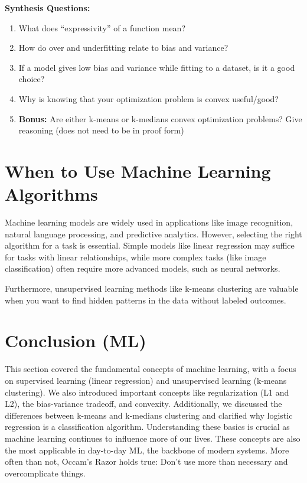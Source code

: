 \begin{questionbox}
\textbf{Synthesis Questions:}
\begin{enumerate}
    \item What does ``expressivity''  of a function mean?
    \item How do over and underfitting relate to bias and variance?
    \item If a model gives low bias and variance while fitting to a dataset, is it a good choice?
    \item Why is knowing that your optimization problem is convex useful/good?
    \item \textbf{Bonus:} Are either k-means or k-medians convex optimization problems? Give reasoning (does not need to be in proof form)
\end{enumerate}
\end{questionbox}

\section{When to Use Machine Learning Algorithms}
    \large Machine learning models are widely used in applications like image recognition, natural language processing, and predictive analytics. However, selecting the right algorithm for a task is essential. Simple models like linear regression may suffice for tasks with linear relationships, while more complex tasks (like image classification) often require more advanced models, such as neural networks.
    
    Furthermore, unsupervised learning methods like k-means clustering are valuable when you want to find hidden patterns in the data without labeled outcomes.

\section{Conclusion (ML)}
    \large This section covered the fundamental concepts of machine learning, with a focus on supervised learning (linear regression) and unsupervised learning (k-means clustering). We also introduced important concepts like regularization (L1 and L2), the bias-variance tradeoff, and convexity. Additionally, we discussed the differences between k-means and k-medians clustering and clarified why logistic regression is a classification algorithm. Understanding these basics is crucial as machine learning continues to influence more of our lives. These concepts are also the most applicable in day-to-day ML, the backbone of modern systems. More often than not, Occam's Razor holds true: Don't use more than necessary and overcomplicate things.
